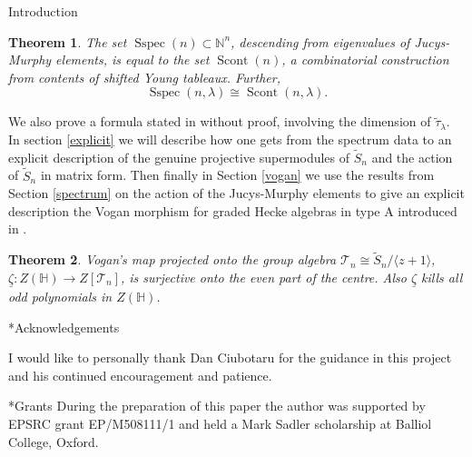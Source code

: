 \documentclass[a4paper,10pt]{amsart}
\newtheorem{theoremalpha}{Theorem}
\DeclareMathOperator{\Sspec}{Sspec}
\DeclareMathOperator{\Scont}{Scont}
\begin{document}
\begin{section}{Introduction}
 
 \begin{theoremalpha} The set $\Sspec(n) \subset \mathbb{N}^n$, descending from eigenvalues of Jucys-Murphy elements, is equal to the set $\Scont(n)$, a combinatorial construction from contents of shifted Young tableaux. Further,
$$\Sspec(n,\lambda) \cong \Scont(n,\lambda).$$ 
\end{theoremalpha} 
We also prove a formula stated in \cite{CH15} without proof, involving the dimension of $\tilde{\tau}_\lambda$. In section \ref{explicit} we will describe how one gets from the spectrum data to an explicit description of the genuine projective supermodules of $\tilde{S}_n$ and the action of $\tilde{S}_n$ in matrix form.
 Then finally in Section \ref{vogan} we use the results from Section \ref{spectrum} on the action of the Jucys-Murphy elements to give an explicit description the Vogan morphism for graded Hecke algebras in type A introduced in \cite{BCT12}.
 
 \begin{theoremalpha} Vogan's map projected onto the group algebra $\mathcal{T}_n \cong \tilde{S}_n/ \langle z +1 \rangle$, $\underline{\zeta}: Z(\mathbb{H}) \to Z[\mathcal{T}_n]$, is surjective onto the even part of the centre. Also $\underline{\zeta}$ kills all odd polynomials in $Z(\mathbb{H})$.\end{theoremalpha}

\begin{subsection}*{Acknowledgements}


I would like to personally thank Dan Ciubotaru for the guidance in this project and his continued encouragement and patience. \end{subsection}

\begin{subsection}*{Grants}
During the preparation of this paper the author was supported by EPSRC grant EP/M508111/1 and held a Mark Sadler scholarship at Balliol College, Oxford. 
\end{subsection}
\end{section}
\end{document}
